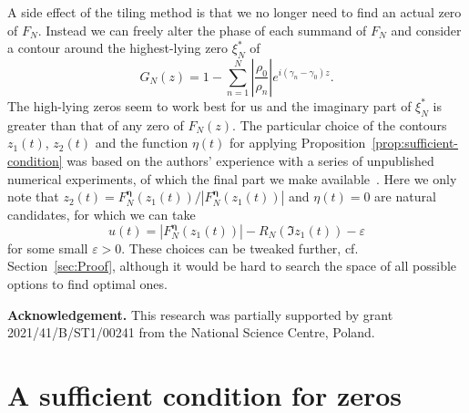 \documentclass[oneside,english]{amsart}
\numberwithin{equation}{section}
\numberwithin{figure}{section}
\theoremstyle{plain}
\theoremstyle{plain}
\theoremstyle{plain}
\theoremstyle{definition}
\begin{document}
A side effect of the tiling method is that we no longer need to find
an actual zero of $F_{N}$. Instead we can freely alter the phase
of each summand of $F_{N}$ and consider a contour around the highest-lying
zero $\xi_{N}^{*}$ of
\[
G_{N}(z)=1-\sum_{n=1}^{N}\left|\frac{\rho_{0}}{\rho_{n}}\right|e^{i(\gamma_{n}-\gamma_{0})z}.
\]
The high-lying zeros seem to work best for us and the imaginary part
of $\xi_{N}^{*}$ is greater than that of any zero of $F_{N}(z)$.
The particular choice of the contours $z_{1}(t)$, $z_{2}(t)$ and
the function $\eta(t)$ for applying Proposition~\ref{prop:sufficient-condition}
was based on the authors' experience with a series of unpublished
numerical experiments, of which the final part we make available~\cite{GKPR}.
Here we only note that $z_{2}(t)=F_{N}^{\boldsymbol{\eta}}(z_{1}(t))/\left|F_{N}^{\boldsymbol{\eta}}(z_{1}(t))\right|$
and $\eta(t)=0$ are natural candidates, for which we can take
\[
u(t)=\left|F_{N}^{\boldsymbol{\eta}}(z_{1}(t))\right|-R_{N}(\Im z_{1}(t))-\varepsilon
\]
for some small $\varepsilon>0$. These choices can be tweaked further,
cf. Section~\ref{sec:Proof}, although it would be hard to search
the space of all possible options to find optimal ones.

\textbf{Acknowledgement. }This research was partially supported by
grant 2021/41/B/ST1/00241 from the National Science Centre, Poland. 

\section{A sufficient condition for zeros}
\end{document}
